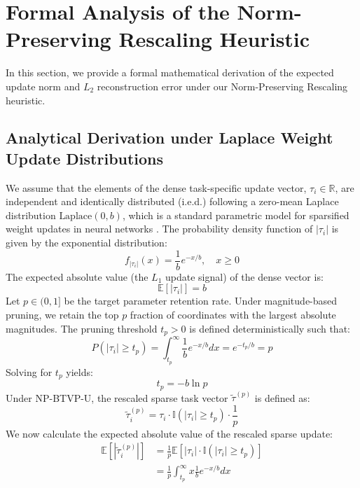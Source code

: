 \section{Formal Analysis of the Norm-Preserving Rescaling Heuristic}
\label{sec:appendix_formal_analysis}

In this section, we provide a formal mathematical derivation of the expected update norm and $L_2$ reconstruction error under our Norm-Preserving Rescaling heuristic.

\subsection{Analytical Derivation under Laplace Weight Update Distributions}
We assume that the elements of the dense task-specific update vector, $\tau_i \in \mathbb{R}$, are independent and identically distributed (i.e.d.) following a zero-mean Laplace distribution $\text{Laplace}(0, b)$, which is a standard parametric model for sparsified weight updates in neural networks \cite{yadav2023ties}. The probability density function of $|\tau_i|$ is given by the exponential distribution:
\begin{equation}
f_{|\tau_i|}(x) = \frac{1}{b} e^{-x/b}, \quad x \geq 0
\end{equation}
The expected absolute value (the $L_1$ update signal) of the dense vector is:
\begin{equation}
\mathbb{E}[|\tau_i|] = b
\end{equation}
Let $p \in (0, 1]$ be the target parameter retention rate. Under magnitude-based pruning, we retain the top $p$ fraction of coordinates with the largest absolute magnitudes. The pruning threshold $t_p > 0$ is defined deterministically such that:
\begin{equation}
P(|\tau_i| \geq t_p) = \int_{t_p}^{\infty} \frac{1}{b} e^{-x/b} dx = e^{-t_p/b} = p
\end{equation}
Solving for $t_p$ yields:
\begin{equation}
t_p = -b \ln p
\end{equation}
Under NP-BTVP-U, the rescaled sparse task vector $\tilde{\tau}^{(p)}$ is defined as:
\begin{equation}
\tilde{\tau}_i^{(p)} = \tau_i \cdot \mathbb{I}(|\tau_i| \geq t_p) \cdot \frac{1}{p}
\end{equation}
We now calculate the expected absolute value of the rescaled sparse update:
\begin{align}
\mathbb{E}[|\tilde{\tau}_i^{(p)}|] &= \frac{1}{p} \mathbb{E}\left[ |\tau_i| \cdot \mathbb{I}(|\tau_i| \geq t_p) \right] \nonumber \\
&= \frac{1}{p} \int_{t_p}^{\infty} x \frac{1}{b} e^{-x/b} dx
\end{align}
